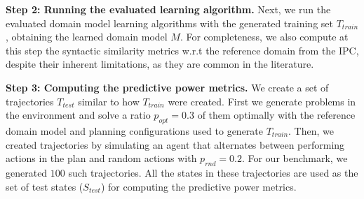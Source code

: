 \documentclass[letterpaper]{article} %
\newcommand{\T}{T}
\newcommand{\Ttrain}{\T_{\textit{train}}}
\newcommand{\Ttest}{\T_{\textit{test}}}
\newcommand{\miniparagraph}[1]{\textbf{#1.}}
\newcommand{\stest}{\ensuremath{S_{\textit{test}}}\xspace}
\newcommand{\ptest}{\ensuremath{\Pi_{\textit{test}}}\xspace}
\newif\ifaddcomments
\newcommand{\roni}[1]{\ifaddcomments{\textcolor{red}{[Roni: #1]}}\fi}
\newcommand{\leo}[1]{\ifaddcomments{\textcolor{pink}{[Leonardo: #1]}}\fi}
\begin{document}
%
\miniparagraph{Step 2: Running the evaluated learning algorithm}
Next, we run the evaluated domain model learning algorithms with the generated training set $\Ttrain$, obtaining the learned domain model $M$. For completeness, we also compute at this step the syntactic similarity metrics w.r.t the reference domain from the IPC, despite their inherent limitations, as they are common in the literature. %

%

\miniparagraph{Step 3: Computing the predictive power metrics}
We create a set of trajectories $\Ttest$ similar to how $\Ttrain$ were created. First we generate problems in the environment and solve a ratio $p_{opt}=0.3$ of them optimally with the reference domain model and planning configurations used to generate $\Ttrain$. 
Then, we created trajectories by simulating an agent that alternates between performing actions in the plan and random actions with $p_{rnd}=0.2$. For our benchmark, we generated $100$ such trajectories. 
All the states in these trajectories are used as the set of test states ($\stest$) for computing the predictive power metrics. 




\end{document}
